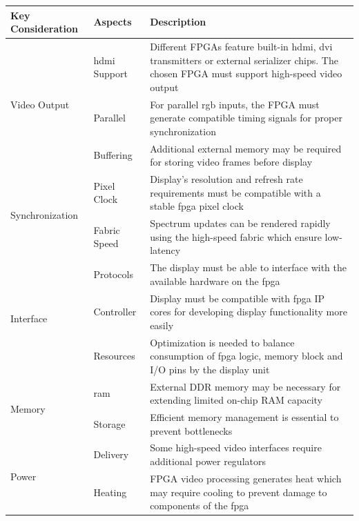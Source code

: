\documentclass[class=report,11pt,crop=false]{standalone}
\begin{document}
	\begin{table}[ht!]
		\centering
		\begin{tabular}{|m{8em}|m{10em}|m{22em}|}
			\hline
			\cellcolor{cyan!25}\textbf{Key Consideration} & \cellcolor{cyan!25}\textbf{Aspects} & \cellcolor{cyan!25}\textbf{Description} \\
			\hline
			\multirow{3}{*}{Video Output} 
			& \acrshort{hdmi} Support & Different FPGAs feature built-in \acrshort{hdmi}, \acrshort{dvi} transmitters or external serializer chips. The chosen FPGA must support high-speed video output \\
			\cline{2-3}
			& Parallel & For parallel \acrshort{rgb} inputs, the FPGA must generate compatible timing signals for proper synchronization \\
			\cline{2-3}
			& Buffering & Additional external memory may be required for storing video frames before display \\
			\hline
			
			\multirow{2}{*}{Synchronization} 
			& Pixel Clock & Display’s resolution and refresh rate requirements must be compatible with a stable \acrshort{fpga} pixel clock \\
			\cline{2-3}
			& Fabric Speed & Spectrum updates can be rendered rapidly using the high-speed fabric which ensure low-latency \\
			\hline
			
			\multirow{3}{*}{Interface} 
			& Protocols & The display must be able to interface with the available hardware on the \acrshort{fpga} \\
			\cline{2-3}
			& Controller & Display must be compatible with \acrshort{fpga} IP cores for developing display functionality more easily\\
			\cline{2-3}
			& Resources & Optimization is needed to balance consumption of \acrshort{fpga} logic, memory block and I/O pins by the display unit \\
			\hline
			
			\multirow{2}{*}{Memory} 
			& \acrshort{ram} & External DDR memory may be necessary for extending limited on-chip RAM capacity \\
			\cline{2-3}
			& Storage & Efficient memory management is essential to prevent bottlenecks \\
			\hline
			
			\multirow{2}{*}{Power} 
			& Delivery & Some high-speed video interfaces require additional power regulators\\
			\cline{2-3}
			& Heating & FPGA video processing generates heat which may require cooling to prevent damage to components of the \acrshort{fpga} \\
			\hline
			

\end{tabular}
\end{table}
\end{document}
